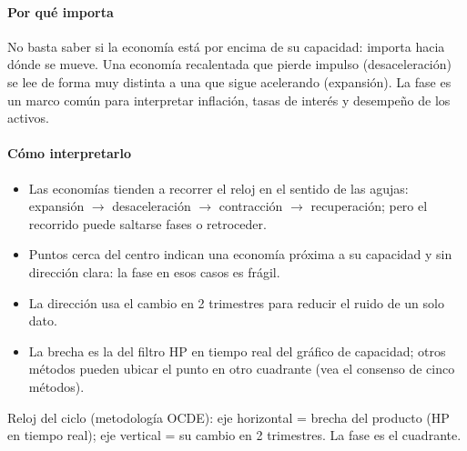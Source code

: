 \paragraph{Por qué importa}
No basta saber si la economía está por encima de su capacidad: importa hacia dónde se mueve. Una economía recalentada que pierde impulso (desaceleración) se lee de forma muy distinta a una que sigue acelerando (expansión). La fase es un marco común para interpretar inflación, tasas de interés y desempeño de los activos.

\paragraph{Cómo interpretarlo}
\begin{itemize}
\item Las economías tienden a recorrer el reloj en el sentido de las agujas: expansión $\rightarrow$ desaceleración $\rightarrow$ contracción $\rightarrow$ recuperación; pero el recorrido puede saltarse fases o retroceder.
\item Puntos cerca del centro indican una economía próxima a su capacidad y sin dirección clara: la fase en esos casos es frágil.
\item La dirección usa el cambio en 2 trimestres para reducir el ruido de un solo dato.
\item La brecha es la del filtro HP en tiempo real del gráfico de capacidad; otros métodos pueden ubicar el punto en otro cuadrante (vea el consenso de cinco métodos).
\end{itemize}
\begin{formulas}[Fórmulas]
\end{formulas}
\begin{metodo}[Metodología]
Reloj del ciclo (metodología OCDE): eje horizontal = brecha del producto (HP en tiempo real); eje vertical = su cambio en 2 trimestres. La fase es el cuadrante.
\par{}
\end{metodo}

